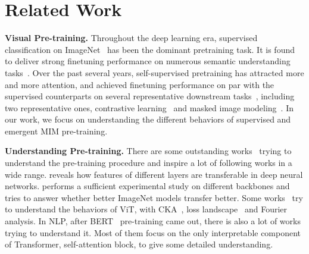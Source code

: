 \documentclass{article}
\begin{document}
\section{Related Work}

\noindent\textbf{Visual Pre-training.} Throughout the deep learning era, supervised classification on ImageNet~\cite{deng2009imagenet} has been the dominant pretraining task. It is found to deliver strong finetuning performance on numerous semantic understanding tasks~\cite{donahue2014decaf,kornblith2019better,alex2019big,dosovitskiy2020vit,sermanet2013overfeat,girshick2014rich,liu2021swin,long2015fully,simonyan2014two,carreira2017quo}. Over the past several years, self-supervised pretraining has attracted more and more attention, and achieved finetuning performance on par with the supervised counterparts on several representative downstream tasks~\cite{he2019moco,chen2020simclr}, including two representative ones, contrastive learning~\cite{dosovitskiy2014exemplarcnn,he2019moco,chen2020simclr,cao2020pic,grill2020byol} and masked image modeling~\cite{chen2020imagegpt,bao2021beit,he2021masked,xie2021simmim}. 
In our work, we focus on understanding the different behaviors of supervised and emergent MIM pre-training.


\noindent\textbf{Understanding Pre-training.} There are some outstanding works~\cite{yosinski2014transferable,kornblith2019better,zhai2019large,nguyen2020wide,neyshabur2020being,raghu2021vision,park2022vision} trying to understand the pre-training procedure and inspire a lot of following works in a wide range. \cite{yosinski2014transferable} reveals how features of different layers are transferable in deep neural networks. \cite{kornblith2019better} performs a sufficient experimental study on different backbones and tries to answer whether better ImageNet models transfer better. Some works~\cite{raghu2021vision,zhou2021convnets,raghu2021vision} try to understand the behaviors of ViT, with CKA~\cite{cka}, loss landscape~\cite{li2018visualizing} and Fourier analysis.
In NLP, after BERT~\cite{devlin2018bert} pre-training came out, there is also a lot of works~\cite{kovaleva2019revealing,hao2019visualizing,clark2019does,hao2020self} trying to understand it. Most of them focus on the only interpretable component of Transformer, self-attention block, to give some detailed understanding.
\end{document}
